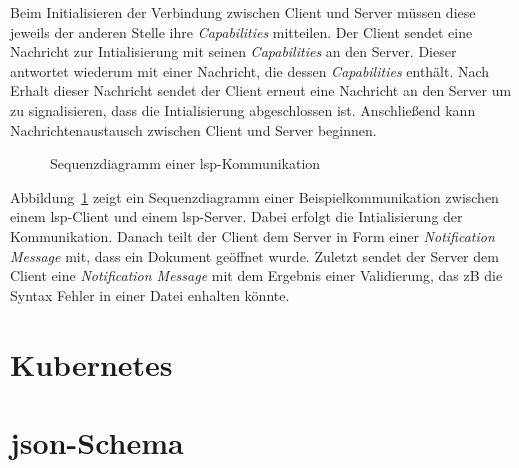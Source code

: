Beim Initialisieren der Verbindung zwischen Client und Server müssen diese jeweils der anderen Stelle ihre \textit{Capabilities} mitteilen.
Der Client sendet eine Nachricht zur Intialisierung mit seinen \textit{Capabilities} an den Server.
Dieser antwortet wiederum mit einer Nachricht, die dessen \textit{Capabilities} enthält.
Nach Erhalt dieser Nachricht sendet der Client erneut eine Nachricht an den Server um zu signalisieren, dass die Intialisierung abgeschlossen ist.
Anschließend kann Nachrichtenaustausch zwischen Client und Server beginnen\cite{lsp-microsoft,lsp-medium}.

\begin{figure}[htp] %
    \centering
    \caption{Sequenzdiagramm einer \acs{lsp}-Kommunikation}
    \label{fig:lsp-sequence-diagram}
\end{figure}

Abbildung~\ref{fig:lsp-sequence-diagram} zeigt ein Sequenzdiagramm einer Beispielkommunikation zwischen einem \ac{lsp}-Client und einem \ac{lsp}-Server.
Dabei erfolgt die Intialisierung der Kommunikation. Danach teilt der Client dem Server in Form einer \textit{Notification Message} mit, dass ein Dokument geöffnet wurde.
Zuletzt sendet der Server dem Client eine \textit{Notification Message} mit dem Ergebnis einer Validierung, das \acs{zB} die Syntax Fehler in einer Datei enhalten könnte.

\section{Kubernetes}

\section{\acs{json}-Schema}